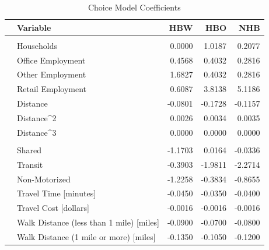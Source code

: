 \begin{table}

\caption{\label{tab:coeffs}Choice Model Coefficients}
\centering
\begin{tabular}[t]{llrrr}
\toprule
 & Variable & HBW & HBO & NHB\\
\midrule
\addlinespace[0.3em]
\multicolumn{5}{l}{\textbf{Destination Choice}}\\
\hspace{1em} & Households & 0.0000 & 1.0187 & 0.2077\\

\hspace{1em} & Office Employment & 0.4568 & 0.4032 & 0.2816\\

\hspace{1em} & Other Employment & 1.6827 & 0.4032 & 0.2816\\

\hspace{1em} & Retail Employment & 0.6087 & 3.8138 & 5.1186\\

\hspace{1em} & Distance & -0.0801 & -0.1728 & -0.1157\\

\hspace{1em} & Distance\textasciicircum{}2 & 0.0026 & 0.0034 & 0.0035\\

\hspace{1em} & Distance\textasciicircum{}3 & 0.0000 & 0.0000 & 0.0000\\
\cmidrule{1-5}
\addlinespace[0.3em]
\multicolumn{5}{l}{\textbf{Mode Choice}}\\
\hspace{1em} & Shared & -1.1703 & 0.0164 & -0.0336\\

\hspace{1em} & Transit & -0.3903 & -1.9811 & -2.2714\\

\hspace{1em} & Non-Motorized & -1.2258 & -0.3834 & -0.8655\\

\hspace{1em} & Travel Time [minutes] & -0.0450 & -0.0350 & -0.0400\\

\hspace{1em} & Travel Cost [dollars] & -0.0016 & -0.0016 & -0.0016\\

\hspace{1em} & Walk Distance (less than 1 mile) [miles] & -0.0900 & -0.0700 & -0.0800\\

\hspace{1em} & Walk Distance (1 mile or more) [miles] & -0.1350 & -0.1050 & -0.1200\\
\bottomrule
\end{tabular}
\end{table}

